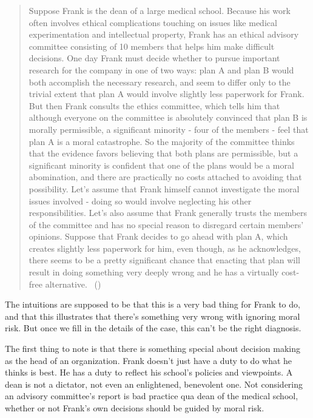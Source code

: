 \documentclass[
  10pt,
  letterpaper,
  twoside]{scrbook}
\begin{document}
\begin{quote}
Suppose {Frank} is the dean of a large medical school. Because his work
often involves ethical complications touching on issues like medical
experimentation and intellectual property, {Frank} has an ethical
advisory committee consisting of 10 members that helps him make
difficult decisions. One day {Frank} must decide whether to pursue
important research for the company in one of two ways: plan A and plan B
would both accomplish the necessary research, and seem to differ only to
the trivial extent that plan A would involve slightly less paperwork for
{Frank}. But then {Frank} consults the ethics committee, which tells him
that although everyone on the committee is absolutely convinced that
plan B is morally permissible, a significant minority - four of the
members - feel that plan A is a moral catastrophe. So the majority of
the committee thinks that the evidence favors believing that both plans
are permissible, but a significant minority is confident that one of the
plans would be a moral abomination, and there are practically no costs
attached to avoiding that possibility. Let's assume that {Frank} himself
cannot investigate the moral issues involved - doing so would involve
neglecting his other responsibilities. Let's also assume that {Frank}
generally trusts the members of the committee and has no special reason
to disregard certain members' opinions. Suppose that {Frank} decides to
go ahead with plan A, which creates slightly less paperwork for him,
even though, as he acknowledges, there seems to be a pretty significant
chance that enacting that plan will result in doing something very
deeply wrong and he has a virtually cost-free alternative.
~()
\end{quote}

The intuitions are supposed to be that this is a very bad thing for
{Frank} to do, and that this illustrates that there's something very
wrong with ignoring moral risk. But once we fill in the details of the
case, this can't be the right diagnosis.

The first thing to note is that there is something special about
decision making as the head of an organization. {Frank} doesn't just
have a duty to do what he thinks is best. He has a duty to reflect his
school's policies and viewpoints. A dean is not a dictator, not even an
enlightened, benevolent one. Not considering an advisory committee's
report is bad practice qua dean of the medical school, whether or not
{Frank}'s own decisions should be guided by moral risk.
\end{document}
